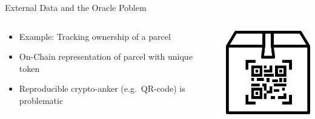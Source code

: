 \documentclass[]{beamer}
\begin{document}
\begin{frame}{External Data and the Oracle Poblem}
	\begin{columns}
		\begin{column}{0.6\textwidth}
			\begin{itemize}[<+->]
				\item Example: Tracking ownership of a parcel
				\item On-Chain representation of parcel with unique token
				\item Reproducible crypto-anker (e.g.~QR-code) is problematic
			\end{itemize}
		\end{column}
		\begin{column}{0.4\textwidth}
			\includegraphics[width=4cm]{../assets/images/parcel.png}
		\end{column}
	\end{columns}
\end{frame}

\end{document}
